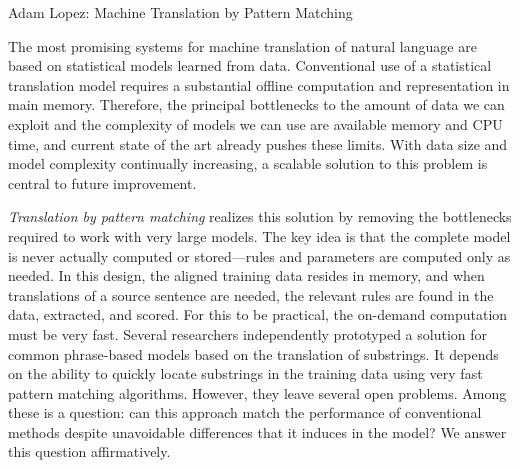 \documentclass[11pt]{thesis-2}  %
\renewcommand{\baselinestretch}{1} %
\begin{document}
	{\Large \begin{center}Adam Lopez: Machine Translation by Pattern Matching\end{center}} %

	\large \normalsize
	The most promising systems for machine translation of natural language
	are based on statistical models learned from data.  Conventional
	use of a statistical translation model requires a substantial
	offline computation and representation in main memory.
	Therefore, the principal bottlenecks to the amount of data we can exploit
	and the complexity of models we can use are available memory and CPU time,
	and current state of the art already pushes these limits.  With data size
	and model complexity continually increasing, a scalable solution to this
	problem is central to future improvement.

	{\em Translation by pattern matching} realizes this solution by removing 
	the bottlenecks required to work with very large models.  The key idea is 
	that the complete model is never actually computed or stored---rules and parameters 
	are computed only as needed.  In this design, the aligned training data resides in 
	memory, and when translations of a source sentence are needed, the relevant rules are found in 
	the data, extracted, and scored.  For this to be practical, the on-demand computation must be 
	very fast.  Several researchers independently prototyped a solution for common
	phrase-based models based on the translation of substrings.  It depends on the
	ability to quickly locate substrings in the training data using very fast
	pattern matching algorithms.  However, they leave several open problems.  
	Among these is a question: can this approach match the performance of conventional 
	methods despite unavoidable differences that it induces in the model?  We answer
	this question affirmatively.
\end{document}
